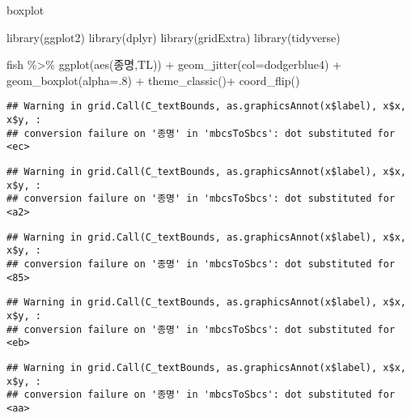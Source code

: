 \documentclass[
]{article}
\newenvironment{Shaded}{\begin{snugshade}}{\end{snugshade}}
\newcommand{\AttributeTok}[1]{\textcolor[rgb]{0.77,0.63,0.00}{#1}}
\newcommand{\DecValTok}[1]{\textcolor[rgb]{0.00,0.00,0.81}{#1}}
\newcommand{\FunctionTok}[1]{\textcolor[rgb]{0.00,0.00,0.00}{#1}}
\newcommand{\NormalTok}[1]{#1}
\newcommand{\SpecialCharTok}[1]{\textcolor[rgb]{0.00,0.00,0.00}{#1}}
\newcommand{\StringTok}[1]{\textcolor[rgb]{0.31,0.60,0.02}{#1}}
\begin{document}
boxplot

\begin{Shaded}
\begin{Highlighting}[]
\FunctionTok{library}\NormalTok{(ggplot2)}
\FunctionTok{library}\NormalTok{(dplyr)}
\FunctionTok{library}\NormalTok{(gridExtra)}
\FunctionTok{library}\NormalTok{(tidyverse)}
\end{Highlighting}
\end{Shaded}

\begin{Shaded}
\begin{Highlighting}[]
\NormalTok{fish }\SpecialCharTok{\%\textgreater{}\%} \FunctionTok{ggplot}\NormalTok{(}\FunctionTok{aes}\NormalTok{(종명,TL)) }\SpecialCharTok{+} \FunctionTok{geom\_jitter}\NormalTok{(}\AttributeTok{col=}\StringTok{\textquotesingle{}dodgerblue4\textquotesingle{}}\NormalTok{) }\SpecialCharTok{+} \FunctionTok{geom\_boxplot}\NormalTok{(}\AttributeTok{alpha=}\NormalTok{.}\DecValTok{8}\NormalTok{) }\SpecialCharTok{+} \FunctionTok{theme\_classic}\NormalTok{()}\SpecialCharTok{+} \FunctionTok{coord\_flip}\NormalTok{()}
\end{Highlighting}
\end{Shaded}

\begin{verbatim}
## Warning in grid.Call(C_textBounds, as.graphicsAnnot(x$label), x$x, x$y, :
## conversion failure on '종명' in 'mbcsToSbcs': dot substituted for <ec>
\end{verbatim}

\begin{verbatim}
## Warning in grid.Call(C_textBounds, as.graphicsAnnot(x$label), x$x, x$y, :
## conversion failure on '종명' in 'mbcsToSbcs': dot substituted for <a2>
\end{verbatim}

\begin{verbatim}
## Warning in grid.Call(C_textBounds, as.graphicsAnnot(x$label), x$x, x$y, :
## conversion failure on '종명' in 'mbcsToSbcs': dot substituted for <85>
\end{verbatim}

\begin{verbatim}
## Warning in grid.Call(C_textBounds, as.graphicsAnnot(x$label), x$x, x$y, :
## conversion failure on '종명' in 'mbcsToSbcs': dot substituted for <eb>
\end{verbatim}

\begin{verbatim}
## Warning in grid.Call(C_textBounds, as.graphicsAnnot(x$label), x$x, x$y, :
## conversion failure on '종명' in 'mbcsToSbcs': dot substituted for <aa>
\end{verbatim}
\end{document}
